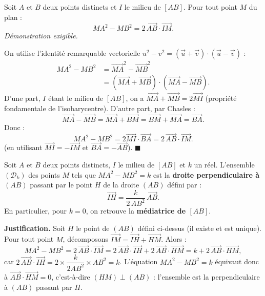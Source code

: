 \documentclass[11pt]{article}
\begin{document}
\begin{propriete}[Réduction de $MA^2 - MB^2$]
Soit $A$ et $B$ deux points distincts et $I$ le milieu de $[AB]$. Pour tout point $M$ du plan :
\[ MA^2 - MB^2 = 2\,\overrightarrow{AB} \cdot \overrightarrow{IM}. \]
\emph{Démonstration exigible.}
\end{propriete}

\begin{experience}[Démonstration]
On utilise l'identité remarquable vectorielle $u^2 - v^2 = (\vec{u} + \vec{v})\cdot(\vec{u} - \vec{v})$ :
\begin{align*}
MA^2 - MB^2 &= \overrightarrow{MA}^2 - \overrightarrow{MB}^2 \\
&= \left(\overrightarrow{MA} + \overrightarrow{MB}\right)\cdot\left(\overrightarrow{MA} - \overrightarrow{MB}\right).
\end{align*}
D'une part, $I$ étant le milieu de $[AB]$, on a $\overrightarrow{MA} + \overrightarrow{MB} = 2\overrightarrow{MI}$ (propriété fondamentale de l'isobarycentre). D'autre part, par Chasles :
\[ \overrightarrow{MA} - \overrightarrow{MB} = \overrightarrow{MA} + \overrightarrow{BM} = \overrightarrow{BM} + \overrightarrow{MA} = \overrightarrow{BA}. \]
Donc :
\[ MA^2 - MB^2 = 2\overrightarrow{MI}\cdot\overrightarrow{BA} = 2\,\overrightarrow{AB}\cdot\overrightarrow{IM}. \]
(en utilisant $\overrightarrow{MI} = -\overrightarrow{IM}$ et $\overrightarrow{BA} = -\overrightarrow{AB}$). \hfill$\blacksquare$
\end{experience}

\begin{propriete}[Ensemble des points $M$ tels que $MA^2 - MB^2 = k$]
Soit $A$ et $B$ deux points distincts, $I$ le milieu de $[AB]$ et $k$ un réel. L'ensemble $(\mathcal{D}_k)$ des points $M$ tels que $MA^2 - MB^2 = k$ est la \textbf{droite perpendiculaire à $(AB)$} passant par le point $H$ de la droite $(AB)$ défini par :
\[ \overrightarrow{IH} = \frac{k}{2\,AB^2}\,\overrightarrow{AB}. \]
En particulier, pour $k = 0$, on retrouve la \textbf{médiatrice de $[AB]$}.
\end{propriete}

\textbf{Justification.} Soit $H$ le point de $(AB)$ défini ci-dessus (il existe et est unique). Pour tout point $M$, décomposons $\overrightarrow{IM} = \overrightarrow{IH} + \overrightarrow{HM}$. Alors :
\[ MA^2 - MB^2 = 2\,\overrightarrow{AB}\cdot\overrightarrow{IM} = 2\,\overrightarrow{AB}\cdot\overrightarrow{IH} + 2\,\overrightarrow{AB}\cdot\overrightarrow{HM} = k + 2\,\overrightarrow{AB}\cdot\overrightarrow{HM}, \]
car $2\,\overrightarrow{AB}\cdot\overrightarrow{IH} = 2 \times \dfrac{k}{2AB^2} \times AB^2 = k$. L'équation $MA^2 - MB^2 = k$ équivaut donc à $\overrightarrow{AB}\cdot\overrightarrow{HM} = 0$, c'est-à-dire $(HM) \perp (AB)$ : l'ensemble est la perpendiculaire à $(AB)$ passant par $H$.
\end{document}
